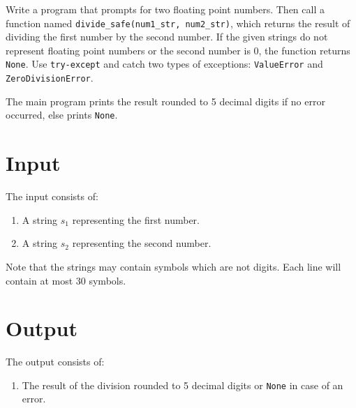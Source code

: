 
Write a program that prompts for two floating point numbers.
Then call a function named \texttt{divide\_safe(num1\_str, num2\_str)},
which returns the result of dividing the first number by the second number.
If the given strings do not represent floating point numbers
or the second number is 0, the function returns \texttt{None}.
Use \texttt{try-except} and catch two types of exceptions:
\texttt{ValueError} and \texttt{ZeroDivisionError}.

The main program prints the result rounded to 5 decimal digits if no error occurred, else prints \texttt{None}.

\section*{Input}
The input consists of:
\begin{enumerate}
    \item A string $s_1$ representing the first number.
    \item A string $s_2$ representing the second number.
\end{enumerate}
Note that the strings may contain symbols which are not digits.
Each line will contain at most $30$ symbols.

\section*{Output}
The output consists of:
\begin{enumerate}
    \item The result of the division rounded to 5 decimal digits or \texttt{None} in case of an error.
\end{enumerate}
